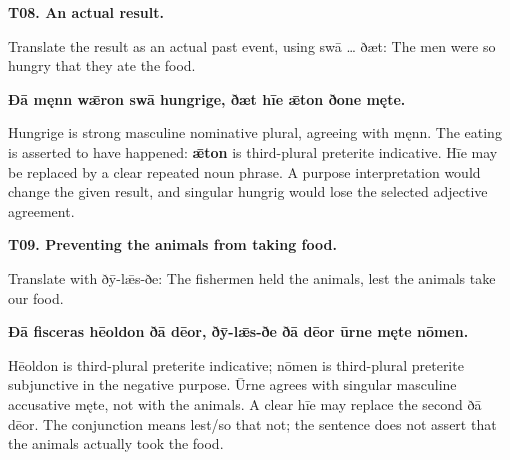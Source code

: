 \par\begin{minipage}{\linewidth}\raggedright
\textbf{T08. An actual result.}

Translate the result as an actual past event, using swā … ðæt: The men were so hungry that they ate the food.

\textbf{Ðā męnn wǣron swā hungrige, ðæt hīe ǣton ðone męte.}

Hungrige is strong masculine nominative plural, agreeing with męnn. The eating is asserted to have happened: \textbf{ǣton} is third-plural preterite indicative. Hīe may be replaced by a clear repeated noun phrase. A purpose interpretation would change the given result, and singular hungrig would lose the selected adjective agreement.

\end{minipage}\par\addvspace{4pt}

\par\begin{minipage}{\linewidth}\raggedright
\textbf{T09. Preventing the animals from taking food.}

Translate with ðȳ-lǣs-ðe: The fishermen held the animals, lest the animals take our food.

\textbf{Ðā fisceras hēoldon ðā dēor, ðȳ-lǣs-ðe ðā dēor ūrne męte nōmen.}

Hēoldon is third-plural preterite indicative; nōmen is third-plural preterite subjunctive in the negative purpose. Ūrne agrees with singular masculine accusative męte, not with the animals. A clear hīe may replace the second ðā dēor. The conjunction means lest/\allowbreak{}so that not; the sentence does not assert that the animals actually took the food.

\end{minipage}\par\addvspace{4pt}

